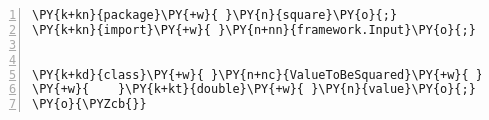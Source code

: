 \begin{Verbatim}[commandchars=\\\{\},numbers=left,firstnumber=1,stepnumber=1,frame=single,fontsize=\small]
\PY{k+kn}{package}\PY{+w}{ }\PY{n}{square}\PY{o}{;}
\PY{k+kn}{import}\PY{+w}{ }\PY{n+nn}{framework.Input}\PY{o}{;}


\PY{k+kd}{class}\PY{+w}{ }\PY{n+nc}{ValueToBeSquared}\PY{+w}{ }\PY{k+kd}{implements}\PY{+w}{ }\PY{n}{Input}\PY{+w}{ }\PY{o}{\PYZob{}}
\PY{+w}{    }\PY{k+kt}{double}\PY{+w}{ }\PY{n}{value}\PY{o}{;}
\PY{o}{\PYZcb{}}
\end{Verbatim}
